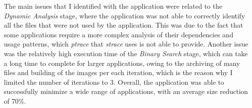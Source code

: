 The main issues that I identified with the application were related to the \textit{Dynamic Analysis} stage, where the application was not able to correctly identify all the files that were not used by the application. This was due to the fact that some applications require a more complex analysis of their dependencies and usage patterns, 
which \textit{ptrace} that \textit{strace} uses is not able to provide.
Another issue was the relatively high execution time of the \textit{Binary Search} stage, which can take a long time to complete for larger applications, owing to the archiving of many files and building of the images per each iteration,
which is the reason why I limited the number of iterations to 3.
Overall, the application was able to successfully minimize a wide range of applications, with an average size reduction of 70\%.